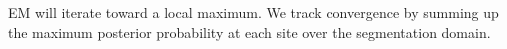 \documentclass[11pt,english]{article}
\newcommand{\argmax}{\operatornamewithlimits{argmax}}
\begin{document}
EM will iterate toward a local maximum.  We track
convergence by summing up the maximum posterior
probability at each site over the segmentation domain.  
%
%
%
%
\end{document}
